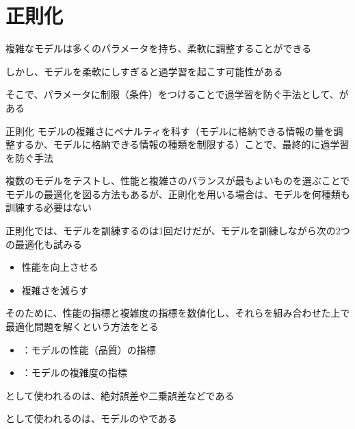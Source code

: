 \documentclass[../../../topic_machine-learning]{subfiles}
\begin{document}
\sectionline
\section{正則化}

複雑なモデルは多くのパラメータを持ち、柔軟に調整することができる

しかし、モデルを柔軟にしすぎると過学習を起こす可能性がある

そこで、パラメータに制限（条件）をつけることで過学習を防ぐ手法として、がある

\begin{definition}{正則化}
  モデルの複雑さにペナルティを科す（モデルに格納できる情報の量を調整するか、モデルに格納できる情報の種類を制限する）ことで、最終的に過学習を防ぐ手法
\end{definition}

複数のモデルをテストし、性能と複雑さのバランスが最もよいものを選ぶことでモデルの最適化を図る方法もあるが、正則化を用いる場合は、モデルを何種類も訓練する必要はない

\br

正則化では、モデルを訓練するのは1回だけだが、モデルを訓練しながら次の2つの最適化も試みる

\begin{itemize}
  \item 性能を向上させる
  \item 複雑さを減らす
\end{itemize}

そのために、性能の指標と複雑度の指標を数値化し、それらを組み合わせた上で最適化問題を解くという方法をとる

\begin{itemize}
  \item {}：モデルの性能（品質）の指標
  \item {}：モデルの複雑度の指標
\end{itemize}

として使われるのは、絶対誤差や二乗誤差などである

として使われるのは、モデルのやである
\end{document}
